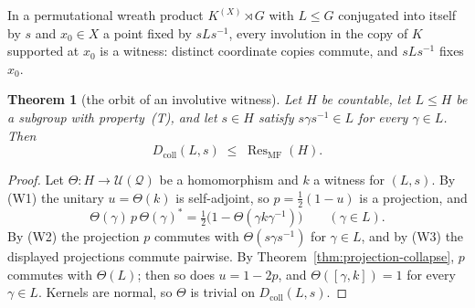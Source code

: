 \documentclass[11pt]{amsart}
\newcommand{\leanverified}[2]{\ignorespaces}
\newtheorem{theorem}{Theorem}[section]
\theoremstyle{definition}
\theoremstyle{remark}
\theoremstyle{plain}
\newcommand{\U}{\mathcal U}
\begin{document}
In a permutational wreath product $K^{(X)}\rtimes G$ with $L\le G$
conjugated into itself by $s$ and $x_0\in X$ a point fixed by
$sLs^{-1}$, every involution in the copy of $K$ supported at $x_0$ is
a witness: distinct coordinate copies commute, and $sLs^{-1}$ fixes
$x_0$.

\begin{theorem}[the orbit of an involutive witness]\label{thm:collapse}
Let $H$ be countable, let $L\le H$ be a subgroup with
property~\textup{(T)}, and let $s\in H$ satisfy
$s\gamma s^{-1}\in L$ for every $\gamma\in L$.  Then
\leanverified{Sofic/ManuscriptExactWrappers}{GroupApproximation.ManuscriptExactWrappers.manuscriptInvolutiveCollapse}
\[
  D_{\mathrm{coll}}(L,s)\;\le\;\operatorname{Res}_{\mathrm{MF}}(H).
\]
\end{theorem}

\begin{proof}
Let $\Theta\colon H\to\U(\mathcal Q)$ be a homomorphism and $k$ a
witness for $(L,s)$.  By (W1) the unitary $u=\Theta(k)$ is
self-adjoint, so $p=\tfrac12(1-u)$ is a projection, and
\[
 \Theta(\gamma)\,p\,\Theta(\gamma)^{*}
 =\tfrac12\bigl(1-\Theta(\gamma k\gamma^{-1})\bigr)
 \qquad(\gamma\in L).
\]
By (W2) the projection $p$ commutes with $\Theta(s\gamma s^{-1})$ for
$\gamma\in L$, and by (W3) the displayed projections commute pairwise.
By Theorem~\ref{thm:projection-collapse}, $p$ commutes with
$\Theta(L)$; then so does $u=1-2p$, and $\Theta([\gamma,k])=1$ for every
$\gamma\in L$.  Kernels are normal, so $\Theta$ is trivial on
$D_{\mathrm{coll}}(L,s)$.
\end{proof}
\end{document}
